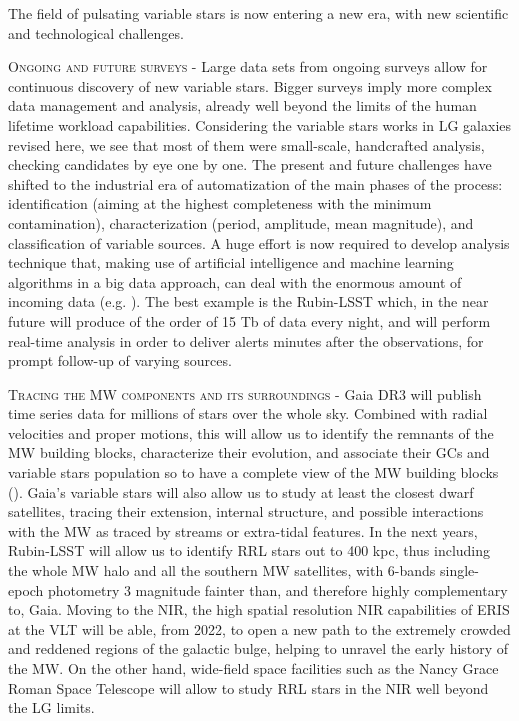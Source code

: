 \documentclass{mem}
\begin{document}
The field of pulsating variable stars is now entering a new era, with new scientific and technological challenges.

\textsc{Ongoing and future surveys -} Large data sets from ongoing surveys allow for continuous discovery of new variable stars. Bigger surveys imply more complex data management and analysis, already well beyond the limits of the human lifetime workload capabilities. Considering the variable stars works in LG galaxies revised here, we see that most of them were small-scale, handcrafted analysis, checking candidates by eye one by one. The present and future challenges have shifted to the industrial era of automatization of the main phases of the process: identification (aiming at the highest completeness with the minimum contamination), characterization (period, amplitude, mean magnitude), and classification of variable sources. A huge effort is now required to develop analysis technique that, making use of artificial intelligence and machine learning algorithms in a big data approach, can deal with the enormous amount of incoming data (e.g. \citealt{richards11,elorrieta16,hernitschek16,holl18,hosenie19}). The best example is the Rubin-LSST which, in the near future will produce of the order of 15 Tb of data every night, and will perform real-time analysis in order to deliver alerts minutes after the observations, for prompt follow-up of varying sources. 

\textsc{Tracing the MW components and its surroundings -} Gaia DR3 will publish time series data for millions of stars over the whole sky. Combined with radial velocities and proper motions, this will allow us to identify the remnants of the MW building blocks, characterize their evolution, and associate their GCs and variable stars population so to have a complete view of the MW building blocks (\citealt{massari19,gallart19}). Gaia's variable stars will also allow us to study at least the closest dwarf satellites, tracing their extension, internal structure, and possible interactions with the MW as traced by streams or extra-tidal features. In the next years, Rubin-LSST will allow us to identify RRL stars out to 400 kpc, thus including the whole MW halo and all the southern MW satellites, with 6-bands single-epoch photometry 3 magnitude fainter than, and therefore highly complementary to, Gaia. Moving to the NIR, the high spatial resolution NIR capabilities of ERIS at the VLT will be able, from 2022, to open a new path to the extremely crowded and reddened regions of the galactic bulge, helping to unravel the early history of the MW. On the other hand, wide-field space facilities such as the Nancy Grace Roman Space Telescope will allow to study RRL stars in the NIR well beyond the LG limits.
\end{document}
